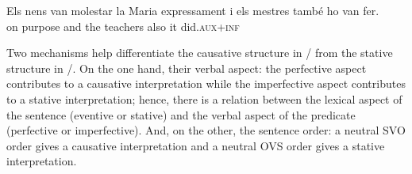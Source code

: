 \documentclass[output=paper,modfonts,nonflat,newtxmath]{langsci/langscibook}
\begin{document}
\ea%
 \label{ex:royo:3}
 \ea \label{ex:royo:3a}
 \gll Els nens van molestar la Maria {expressament} i els mestres també {ho} {van} {fer}.
 \\
 on purpose and the teachers also it did.\textsc{aux+inf}\\
 \glt
 
 
 \z
 \z
 

Two mechanisms help differentiate the causative structure in / from the stative structure in /. On the one hand, their verbal aspect: the perfective aspect contributes to a causative interpretation while the imperfective aspect contributes to a stative interpretation; hence, there is a relation between the lexical aspect of the sentence (eventive or stative) and the verbal aspect of the predicate (perfective or imperfective). And, on the other, the sentence order: a neutral SVO order gives a causative interpretation and a neutral OVS order gives a stative interpretation.
\end{document}
